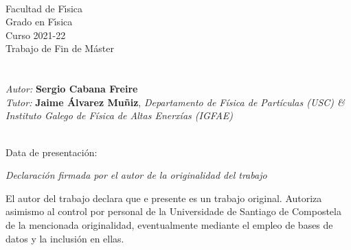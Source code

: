 \documentclass[12 pt, a4paper]{article} %
\numberwithin{equation}{section}
\numberwithin{figure}{section}
\numberwithin{table}{section}
\begin{document}
	
	
	\mbox{}
	\mbox{}\hfill{\large \DataDefensa} \vspace{1cm}
	\begin{center}
	\end{center}
	
	
	\clearpage
	\mbox{}
	\clearpage %
	
	
	\mbox{}\\
	Facultad de F\'{\i}sica\\
	Grado en F\'{\i}sica \\  
	Curso 2021-22\\%
	{\sc Trabajo de Fin de Máster}\vspace{3cm}\\
	{\sc\LARGE \TituloDoTraballo}\vspace{1cm}\\
	{\sl\large \EspecialidadeMaster}\vspace{2cm}\\
	{\sl Autor:} {\bf Sergio Cabana Freire}\\ %
	{\sl Tutor:} {\bf Jaime Álvarez Muñiz}, {\sl Departamento de Física de Partículas (USC) \& Instituto Galego de Física de Altas Enerxías (IGFAE)}\\
	\vspace{1cm}\\
	
	\mbox{}
	
	\mbox{}\hfill{Data de presentaci\'on: \DataDefensa}
	
	
	\clearpage
	
	\thispagestyle{empty}
	\pagebreak
	
	{\sl Declaraci\'on firmada por el autor de la originalidad del trabajo}
	
	El autor del trabajo declara que e presente es un trabajo original. Autoriza asimismo al control por personal de la Universidade de Santiago de Compostela de la mencionada originalidad, eventualmente mediante el empleo de bases de datos y la inclusi\'on en ellas.
	
\end{document}
